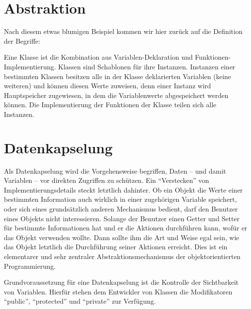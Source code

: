 \section{Abstraktion}

Nach diesem etwas blumigen Beispiel kommen wir hier zurück auf die Definition der Begriffe: 

Eine Klasse ist die Kombination aus Variablen-Deklaration und Funktionen-Implementierung. Klassen sind Schablonen für ihre Instanzen. Instanzen einer bestimmten Klassen besitzen alle in der Klasse deklarierten Variablen (keine weiteren) und können diesen Werte zuweisen, denn einer Instanz wird Hauptspeicher zugewiesen, in dem die Variablenwerte abgespeichert werden können. Die Implementierung der Funktionen der Klasse teilen sich alle Instanzen.

\section{Datenkapselung}\label{chap:encapsule}

Als Datenkapselung wird die Vorgehensweise begriffen, Daten -- und damit Variablen -- vor direkten Zugriffen zu schützen. Ein "`Verstecken"' von Implementierungsdetails steckt letztlich dahinter. Ob ein Objekt die Werte einer bestimmten Information auch wirklich in einer zugehörigen Variable speichert, oder sich eines grundsätzlich anderen Mechanismus bedient, darf den Benutzer eines Objekts nicht interessieren. Solange der Benutzer einen Getter und Setter für bestimmte Informationen hat und er die Aktionen durchführen kann, wofür er das Objekt verwenden wollte. Dann sollte ihm die Art und Weise egal sein, wie das Objekt letztlich die Durchführung seiner Aktionen  erreicht. Dies ist ein elementarer und sehr zentraler Abstraktionsmechanismus der objektorientierten Programmierung.

Grundvoraussetzung für eine Datenkapselung ist die Kontrolle der Sichtbarkeit von Variablen. Hierfür stehen dem Entwickler von Klassen die Modifikatoren "`public"', "`protected"' und "`private"' zur Verfügung. 